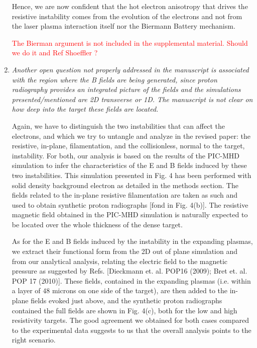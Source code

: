 \documentclass[aps,showpacs,superscriptaddress]{revtex4}%
\begin{document}
\begin{enumerate}
Hence, we are now confident that the hot electron anisotropy that drives the resistive instability  comes from the evolution of the electrons and not from the laser plasma interaction itself nor the Biermann Battery mechanism. 

\textcolor{red}{ The Bierman argument is not included in the supplemental material.  Should we do it and  Ref Shoeffler ?  }

\item \textit{ Another open question not properly addressed in the manuscript is associated with the region where the B fields are being generated, since proton radiography provides an integrated picture of the fields and the simulations presented/mentioned are 2D transverse or 1D. The manuscript is not clear on how deep into the target these fields are located. }

Again, we have to distinguish the two instabilities that can affect the electrons, and which we try to untangle and analyze in the revised paper: the resistive, in-plane, filamentation, and the collisionless, normal to the target, instability. 
For both,  our analysis is based on the results of the PIC-MHD simulation to infer the characteristics of the E and B fields induced by these two instabilities. This simulation presented in Fig. 4 has been performed with solid density background   electron as detailed in the methods section. The fields related to the in-plane resistive filamentation are taken as such and used to obtain synthetic proton radiographs [fond in Fig. 4(b)]. The resistive magnetic field   obtained in the PIC-MHD simulation is naturally expected to be located over the whole thickness of the dense target.  

As for the E and  B fields induced by the instability in the expanding plasmas, we extract their functional form from the 2D out of plane simulation and from our analytical analysis, relating the electric field to the magnetic pressure as suggested by Refs. [Dieckmann et. al. POP16 (2009); Bret et. al. POP 17 (2010)]. These fields, contained in the expanding plasmas (i.e. within a layer of $48$ microns on one side of the target), are then added to the in-plane fields evoked just above, and the synthetic proton radiographs contained the full fields are shown in Fig. 4(c), both for the low and high resistivity targets. The good agreement we obtained for both cases compared to the experimental data suggests to us that the overall analysis points to the right scenario.


\end{enumerate}
\end{document}
